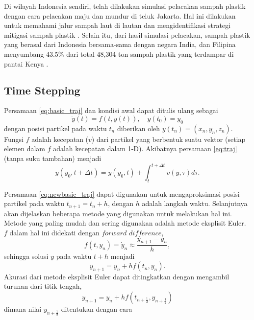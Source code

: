\begin{spacing}{1.5}
	\par Di wilayah Indonesia sendiri, telah dilakukan simulasi pelacakan sampah plastik dengan cara pelacakan  maju dan mundur di teluk Jakarta. Hal ini dilakukan untuk memahami jalur sampah laut di lautan dan mengidentifikasi strategi mitigasi sampah plastik . Selain itu, dari hasil simulasi pelacakan, sampah plastik yang berasal dari Indonesia bersama-sama dengan negara India, dan Filipina menyumbang 43.5\% dari total 48,304 ton sampah plastik yang terdampar di pantai Kenya .     
	
\subsection[Time Stepping]{Time Stepping}
	Persamaan \ref{eq:basic_traj} dan kondisi awal dapat ditulis ulang sebagai 
	\begin{equation}\label{eq:newbasic_traj}
		\dot y(t) = f(t,y(t)), \quad y(t_0)=y_0
	\end{equation}
	dengan posisi partikel pada waktu $t_n$ diberikan  oleh $y(t_n)=(x_n,y_n,z_n)$. Fungsi $f$ adalah kecepatan ($v$) dari partikel yang berbentuk suatu vektor (setiap elemen dalam $f$ adalah kecepatan dalam 1-D). Akibatnya persamaan \ref{eq:traj} (tanpa suku tambahan) menjadi
	\begin{equation}
		y(y_0,t+\Delta t) = y(y_0,t)+\int_{t}^{t+\Delta t}v(y,\tau)d\tau.
	\end{equation}
	\par Persamaan \ref{eq:newbasic_traj} dapat digunakan untuk mengaproksimasi posisi partikel pada waktu $t_{n+1}=t_n+h$, dengan $h$ adalah langkah waktu. Selanjutnya akan dijelaskan beberapa metode yang digunakan untuk melakukan hal ini. Metode yang paling mudah dan sering digunakan adalah metode eksplisit Euler. $f$ dalam hal ini didekati dengan $\textit{forward difference}$,
	\begin{equation*}
		f(t,y_n)=\dot y_n \approx \frac{y_{n+1}-y_n}{h},
	\end{equation*}
	sehingga solusi $y$ pada waktu $t+h$ menjadi
	\begin{equation}
		y_{n+1}=y_n+hf(t_n,y_n).
	\end{equation}
	Akurasi dari metode eksplisit Euler dapat ditingkatkan dengan mengambil turunan dari titik tengah,
	\begin{equation*}
		y_{n+1}=y_n+hf(t_{n+\frac{1}{2}},y_{n+\frac{1}{2}})
	\end{equation*}
	dimana nilai $y_{n+\frac{1}{2}}$ ditentukan dengan cara

\end{spacing}
